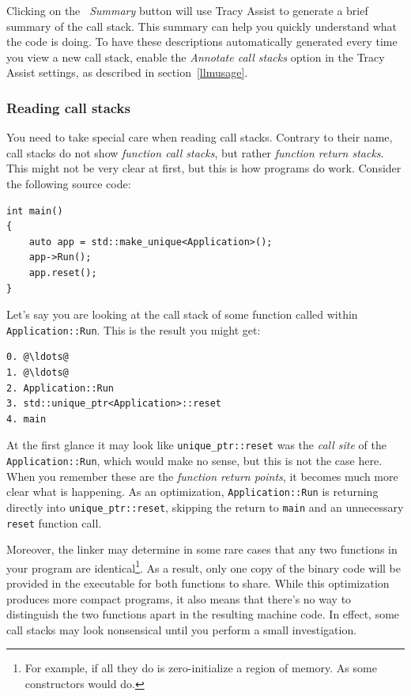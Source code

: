 \documentclass[hidelinks,titlepage,a4paper,twoside]{article}
\begin{document}
Clicking on the \emph{\faTag{}~Summary} button will use Tracy Assist to generate a brief summary of the call stack. This summary can help you quickly understand what the code is doing. To have these descriptions automatically generated every time you view a new call stack, enable the \emph{Annotate call stacks} option in the Tracy Assist settings, as described in section~\ref{llmusage}.

\subsubsection{Reading call stacks}
\label{readingcallstacks}

You need to take special care when reading call stacks. Contrary to their name, call stacks do not show \emph{function call stacks}, but rather \emph{function return stacks}. This might not be very clear at first, but this is how programs do work. Consider the following source code:

\begin{lstlisting}
int main()
{
    auto app = std::make_unique<Application>();
    app->Run();
    app.reset();
}
\end{lstlisting}

Let's say you are looking at the call stack of some function called within \texttt{Application::Run}. This is the result you might get:

\begin{lstlisting}
0. @\ldots@
1. @\ldots@
2. Application::Run
3. std::unique_ptr<Application>::reset
4. main
\end{lstlisting}

At the first glance it may look like \texttt{unique\_ptr::reset} was the \emph{call site} of the \texttt{Application::Run}, which would make no sense, but this is not the case here. When you remember these are the \emph{function return points}, it becomes much more clear what is happening. As an optimization, \texttt{Application::Run} is returning directly into \texttt{unique\_ptr::reset}, skipping the return to \texttt{main} and an unnecessary \texttt{reset} function call.

Moreover, the linker may determine in some rare cases that any two functions in your program are identical\footnote{For example, if all they do is zero-initialize a region of memory. As some constructors would do.}. As a result, only one copy of the binary code will be provided in the executable for both functions to share. While this optimization produces more compact programs, it also means that there's no way to distinguish the two functions apart in the resulting machine code. In effect, some call stacks may look nonsensical until you perform a small investigation.
\end{document}
